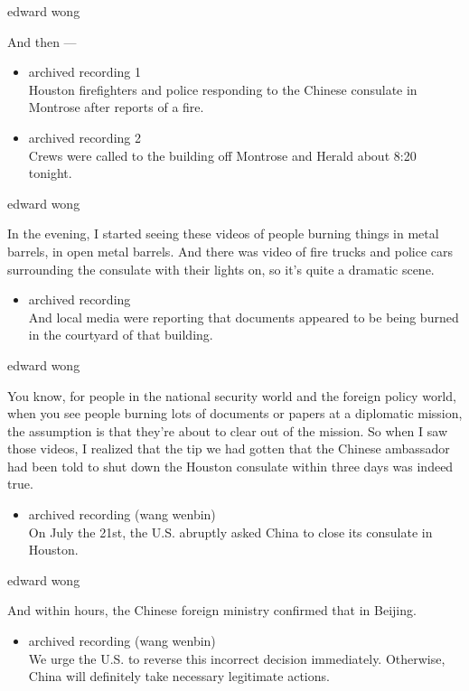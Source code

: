 edward wong

And then ---

\begin{itemize}
\item
  archived recording 1\\
  Houston firefighters and police responding to the Chinese consulate in
  Montrose after reports of a fire.
\item
  archived recording 2\\
  Crews were called to the building off Montrose and Herald about 8:20
  tonight.
\end{itemize}

edward wong

In the evening, I started seeing these videos of people burning things
in metal barrels, in open metal barrels. And there was video of fire
trucks and police cars surrounding the consulate with their lights on,
so it's quite a dramatic scene.

\begin{itemize}
\tightlist
\item
  archived recording\\
  And local media were reporting that documents appeared to be being
  burned in the courtyard of that building.
\end{itemize}

edward wong

You know, for people in the national security world and the foreign
policy world, when you see people burning lots of documents or papers at
a diplomatic mission, the assumption is that they're about to clear out
of the mission. So when I saw those videos, I realized that the tip we
had gotten that the Chinese ambassador had been told to shut down the
Houston consulate within three days was indeed true.

\begin{itemize}
\tightlist
\item
  archived recording (wang wenbin)\\
  On July the 21st, the U.S. abruptly asked China to close its consulate
  in Houston.
\end{itemize}

edward wong

And within hours, the Chinese foreign ministry confirmed that in
Beijing.

\begin{itemize}
\tightlist
\item
  archived recording (wang wenbin)\\
  We urge the U.S. to reverse this incorrect decision immediately.
  Otherwise, China will definitely take necessary legitimate actions.
\end{itemize}

